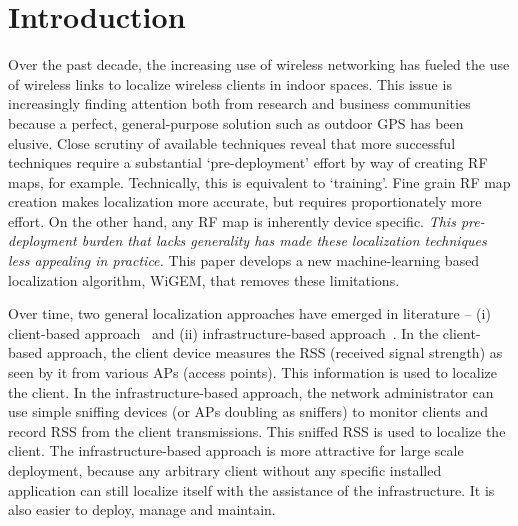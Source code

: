 \section{Introduction}
\label{sec:introduction}

Over the past decade, the increasing use of wireless networking has fueled the 
use of wireless links to localize wireless clients in indoor spaces. This issue
is increasingly finding attention both from research and business communities 
because a perfect, general-purpose solution such as outdoor GPS has been elusive. Close scrutiny 
of available techniques reveal that more successful techniques require a substantial
`pre-deployment' effort by way of creating RF maps, for example. 
Technically, this is equivalent
to `training'. Fine grain RF map creation makes localization 
more accurate, but requires proportionately more effort.
On the other hand, any RF map is inherently device specific.
\emph{This pre-deployment burden that lacks generality
has made these localization techniques less appealing in practice.}  This paper develops a new machine-learning based localization algorithm, WiGEM,
that removes these limitations. 


Over time, two general localization approaches have emerged 
in literature -- (i) client-based approach~\cite{Haeberlen:2004:PRL:1023720.1023728, Gwon:2004:ECC:1023783.1023786, Youssef:2008:HLD:1399551.1399558, Chintalapudi:2010:ILW:1859995.1860016, Ladd:2002:RLS:570645.570674, Youssef:2003:WLD:826025.826335} and (ii)  infrastructure-based approach~\cite{Moraes:2006:CWL:1164783.1164799, Lim:2010:ZIL:1741400.1741464, Tao:2003:WLL:941311.941314, Krishnan04asystem}. In the client-based approach, the client device measures the RSS (received signal strength) as seen by it from various APs (access points). This information is used to localize the client. In the infrastructure-based approach, the network administrator can use simple sniffing devices (or APs doubling as sniffers) to monitor clients and record RSS from the client transmissions.  This sniffed RSS is used to localize the client. The infrastructure-based approach is more attractive for large scale deployment, because
any arbitrary client without any specific installed application can still localize itself
with the assistance of the infrastructure. It is also easier to deploy, manage and maintain. 

